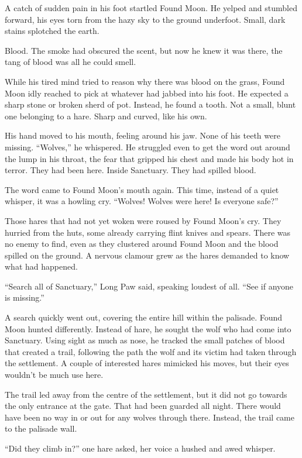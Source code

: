 A catch of sudden pain in his foot startled Found Moon. He yelped and stumbled forward, his eyes torn from the hazy sky to the ground underfoot. Small, dark stains splotched the earth.

Blood. The smoke had obscured the scent, but now he knew it was there, the tang of blood was all he could smell.

While his tired mind tried to reason why there was blood on the grass, Found Moon idly reached to pick at whatever had jabbed into his foot. He expected a sharp stone or broken sherd of pot. Instead, he found a tooth. Not a small, blunt one belonging to a hare. Sharp and curved, like his own.

His hand moved to his mouth, feeling around his jaw. None of his teeth were missing. ``Wolves,'' he whispered. He struggled even to get the word out around the lump in his throat, the fear that gripped his chest and made his body hot in terror. They had been here. Inside Sanctuary. They had spilled blood.

The word came to Found Moon's mouth again. This time, instead of a quiet whisper, it was a howling cry. ``Wolves! Wolves were here! Is everyone safe?''

Those hares that had not yet woken were roused by Found Moon's cry. They hurried from the huts, some already carrying flint knives and spears. There was no enemy to find, even as they clustered around Found Moon and the blood spilled on the ground. A nervous clamour grew as the hares demanded to know what had happened.

``Search all of Sanctuary,'' Long Paw said, speaking loudest of all. ``See if anyone is missing.''

A search quickly went out, covering the entire hill within the palisade. Found Moon hunted differently. Instead of hare, he sought the wolf who had come into Sanctuary. Using sight as much as nose, he tracked the small patches of blood that created a trail, following the path the wolf and its victim had taken through the settlement. A couple of interested hares mimicked his moves, but their eyes wouldn't be much use here.

The trail led away from the centre of the settlement, but it did not go towards the only entrance at the gate. That had been guarded all night. There would have been no way in or out for any wolves through there. Instead, the trail came to the palisade wall.

``Did they climb in?'' one hare asked, her voice a hushed and awed whisper.

